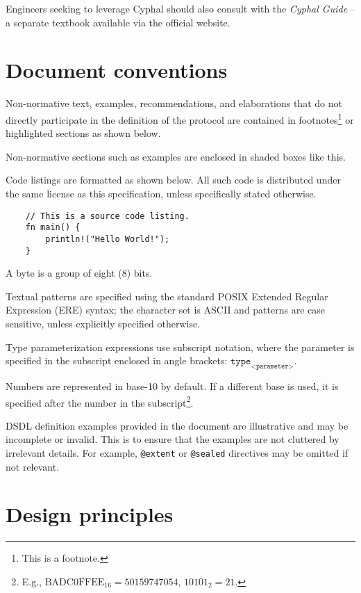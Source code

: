 Engineers seeking to leverage Cyphal should also consult with the \emph{Cyphal Guide} --
a separate textbook available via the official website.

\section{Document conventions}

Non-normative text, examples, recommendations, and elaborations that do not directly participate
in the definition of the protocol are contained in footnotes\footnote{This is a footnote.}
or highlighted sections as shown below.

\begin{remark}
    Non-normative sections such as examples are enclosed in shaded boxes like this.
\end{remark}

Code listings are formatted as shown below.
All such code is distributed under the same license as this specification, unless specifically stated otherwise.

\begin{verbatim}
    // This is a source code listing.
    fn main() {
        println!("Hello World!");
    }
\end{verbatim}

A byte is a group of eight (8) bits.

Textual patterns are specified using the standard
POSIX Extended Regular Expression (ERE) syntax;
the character set is ASCII and patterns are case sensitive, unless explicitly specified otherwise.

Type parameterization expressions use subscript notation,
where the parameter is specified in the subscript enclosed in angle brackets:
$\texttt{type}_\texttt{<parameter>}$.

Numbers are represented in base-10 by default.
If a different base is used, it is specified after the number in the subscript\footnote{%
    E.g., $\text{BADC0FFEE}_{16} = 50159747054$, $10101_2 = 21$.
}.

DSDL definition examples provided in the document are illustrative and may be incomplete or invalid.
This is to ensure that the examples are not cluttered by irrelevant details.
For example, \verb|@extent| or \verb|@sealed| directives may be omitted if not relevant.

\section{Design principles}

